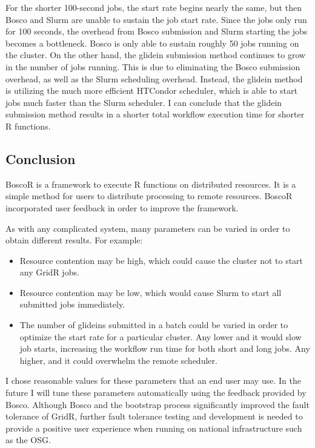 For the shorter 100-second jobs, the start rate begins nearly the same, but then Bosco and Slurm are unable to sustain the job start rate.  Since the jobs only run for 100 seconds, the overhead from Bosco submission and Slurm starting the jobs becomes a bottleneck.  Bosco is only able to sustain roughly 50 jobs running on the cluster.  On the other hand, the glidein submission method continues to grow in the number of jobs running.  This is due to eliminating the Bosco submission overhead, as well as the Slurm scheduling overhead.  Instead, the glidein method is utilizing the much more efficient HTCondor scheduler, which is able to start jobs much faster than the Slurm scheduler.  I can conclude that the glidein submission method results in a shorter total workflow execution time for shorter R functions.


\subsection{Conclusion}

BoscoR is a framework to execute R functions on distributed resources.  It is a simple method for users to distribute processing to remote resources.  BoscoR incorporated user feedback in order to improve the framework.

As with any complicated system, many parameters can be varied in order to obtain different results.  For example:
\begin{itemize}
\item Resource contention may be high, which could cause the cluster not to start any GridR jobs.
\item Resource contention may be low, which would cause Slurm to start all submitted jobs immediately.
\item The number of glideins submitted in a batch could be varied in order to optimize the start rate for a particular cluster.  Any lower and it would slow job starts, increasing the workflow run time for both short and long jobs.  Any higher, and it could overwhelm the remote scheduler.
\end{itemize}

I chose reasonable values for these parameters that an end user may use.  In the future I will tune these parameters automatically using the feedback provided by Bosco.  Although Bosco and the bootstrap process significantly improved the fault tolerance of GridR, further fault tolerance testing and development is needed to provide a positive user experience when running on national infrastructure such as the OSG.

